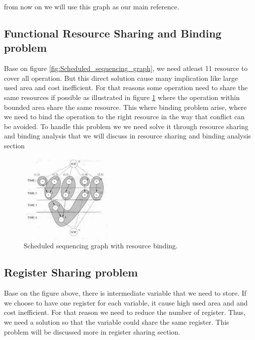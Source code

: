 from now on we will use this graph as our main reference. 

\subsection{Functional Resource Sharing and Binding problem}

Base on figure \ref{fig:Scheduled_sequencing_graph}, we need atleast 11 resource to cover all operation. But this direct solution cause many implication like large used area and cost inefficient. For that reasons some operation need to share the same resources if possible as illustrated in figure \ref{fig:Scheduled_sequencing_graph_with} where the operation within bounded area share the same resource. This where binding problem arise, where we need to bind the operation to the right resource in the way that conflict can be avoided. To handle this problem we we need solve it through resource sharing and binding analysis that we will discuss in resource sharing and binding  analysis section 

\begin{figure}[h]
    \centering
    \includegraphics[width=0.4\textwidth]{Scheduled_sequencing_graph_with}
    \caption{ Scheduled sequencing graph with resource binding. \cite{b1}}
    \label{fig:Scheduled_sequencing_graph_with}
\end{figure} 


\subsection{Register Sharing problem}

Base on the figure above, there is intermediate variable that we need to store. If we choose to have one register for each variable, it cause high used area and and cost inefficient. For that reason we need to reduce the number of register. Thus, we need a solution so that the variable could share the same register. This problem will be discussed more in register sharing section.





